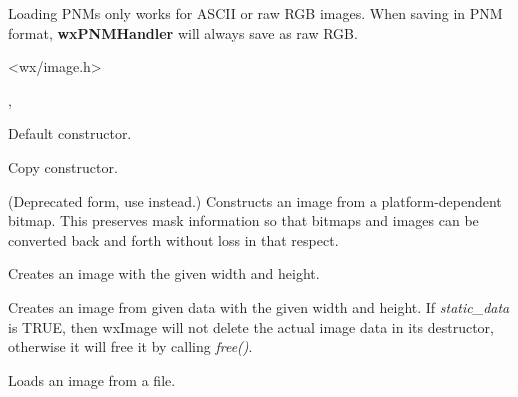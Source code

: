 Loading PNMs only works for ASCII or raw RGB images. When saving in
PNM format, {\bf wxPNMHandler} will always save as raw RGB.




<wx/image.h>


, 


\label{wximageconstr}


Default constructor.


Copy constructor.


(Deprecated form, use 
instead.) Constructs an image from a platform-dependent bitmap. This preserves
mask information so that bitmaps and images can be converted back
and forth without loss in that respect.


Creates an image with the given width and height.


Creates an image from given data with the given width and height. If 
{\it static\_data} is TRUE, then wxImage will not delete the actual
image data in its destructor, otherwise it will free it by calling
{\it free()}.



Loads an image from a file.


